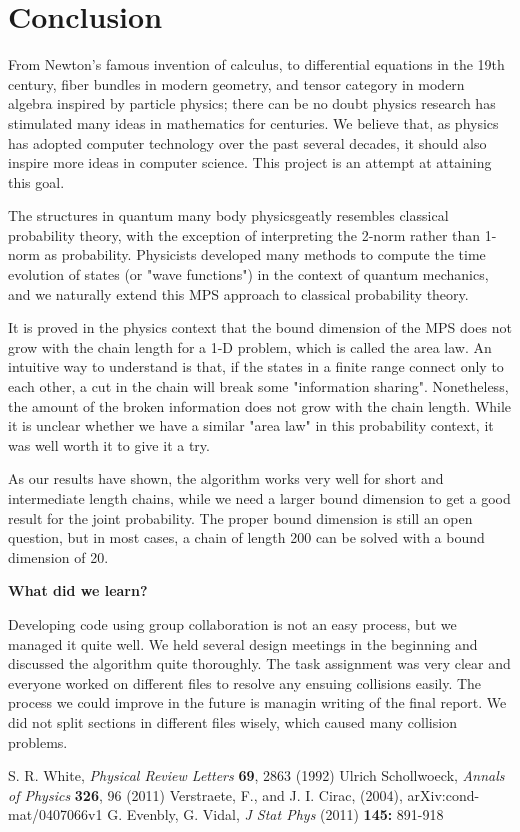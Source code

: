 \documentclass[english]{article}[12pt]
\begin{document}
\section{Conclusion}
From Newton's famous invention of calculus, to differential equations in the 19th century, fiber bundles in modern geometry, and tensor category in modern algebra inspired by particle physics; there can be no doubt physics research has stimulated many ideas in mathematics for centuries. We believe that, as physics has adopted computer technology over the past several decades, it should also inspire more ideas in computer science. This project is an attempt at attaining this goal.

The structures in quantum many body physicsgeatly  resembles classical probability theory, with the exception of interpreting the 2-norm rather than 1-norm as probability. Physicists developed many methods to compute the time evolution of states (or "wave functions") in the context of quantum mechanics, and we naturally extend this MPS approach to classical probability theory.

It is proved in the physics context that the bound dimension of the MPS does not grow with the chain length for a 1-D problem, which is called the area law. An intuitive way to understand is that, if the states in a finite range connect only to each other, a cut in the chain will break some "information sharing". Nonetheless, the amount of the broken information does not grow with the chain length. While it is unclear whether we have a similar "area law" in this probability context, it was well worth it to give it a try.

As our results have shown, the algorithm works very well for short and intermediate length chains, while we need a larger bound dimension to get a good result for the joint probability. The proper bound dimension is still an open question, but in most cases, a chain of length 200 can be solved with a bound dimension of 20.

\noindent \textbf{What did we learn?}

Developing code using group collaboration is not an easy process, but we managed it quite well. We held several design meetings in the beginning and discussed the algorithm quite thoroughly. The task assignment was very clear and everyone worked on different files to resolve any ensuing collisions easily. The process we could improve in the future is managin writing of the final report. We did not split sections in different files wisely, which caused many collision problems.
\newpage
\begin{thebibliography}{99}
 S. R. White, {\it Physical Review Letters} {\bf 69}, 2863 (1992)
 Ulrich Schollwoeck, {\it Annals of Physics} {\bf 326}, 96 (2011)
 Verstraete, F., and J. I. Cirac, (2004), arXiv:cond-mat/0407066v1
G. Evenbly, G. Vidal, {\it J Stat Phys} (2011) {\bf 145:} 891-918
\end{thebibliography}
\end{document}

